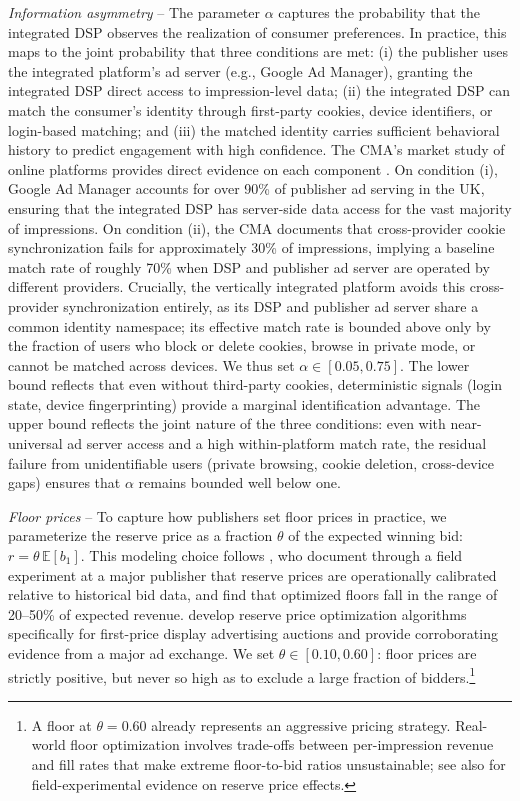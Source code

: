 \documentclass[11pt]{article}
\theoremstyle{plain}
\theoremstyle{definition}
\theoremstyle{plain}
\theoremstyle{plain}
\theoremstyle{plain}
\theoremstyle{plain}
\numberwithin{equation}{section}
\begin{document}
\noindent \textit{Information asymmetry} -- The parameter $\alpha$ captures the probability that the integrated DSP observes the realization of consumer preferences. In practice, this maps to the joint probability that three conditions are met: (i) the publisher uses the integrated platform's ad server (e.g., Google Ad Manager), granting the integrated DSP direct access to impression-level data; (ii) the integrated DSP can match the consumer's identity through first-party cookies, device identifiers, or login-based matching; and (iii) the matched identity carries sufficient behavioral history to predict engagement with high confidence. The CMA's market study of online platforms provides direct evidence on each component \parencite{competitionandmarketsauthorityOnlinePlatformsDigital2020}. On condition (i), Google Ad Manager accounts for over 90\% of publisher ad serving in the UK, ensuring that the integrated DSP has server-side data access for the vast majority of impressions. On condition (ii), the CMA documents that cross-provider cookie synchronization fails for approximately 30\% of impressions, implying a baseline match rate of roughly 70\% when DSP and publisher ad server are operated by different providers. Crucially, the vertically integrated platform avoids this cross-provider synchronization entirely, as its DSP and publisher ad server share a common identity namespace; its effective match rate is bounded above only by the fraction of users who block or delete cookies, browse in private mode, or cannot be matched across devices. We thus set $\alpha \in [0.05, 0.75]$. The lower bound reflects that even without third-party cookies, deterministic signals (login state, device fingerprinting) provide a marginal identification advantage. The upper bound reflects the joint nature of the three conditions: even with near-universal ad server access and a high within-platform match rate, the residual failure from unidentifiable users (private browsing, cookie deletion, cross-device gaps) ensures that $\alpha$ remains bounded well below one.\par
\vspace{1mm}
\noindent \textit{Floor prices} -- To capture how publishers set floor prices in practice, we parameterize the reserve price as a fraction $\theta$ of the expected winning bid: $r = \theta \, \mathbb{E}[b_1]$. This modeling choice follows \textcite{choiOptimizingReservePrices2023}, who document through a field experiment at a major publisher that reserve prices are operationally calibrated relative to historical bid data, and find that optimized floors fall in the range of 20--50\% of expected revenue. \textcite{fengReservePriceOptimization2021} develop reserve price optimization algorithms specifically for first-price display advertising auctions and provide corroborating evidence from a major ad exchange. We set $\theta \in [0.10, 0.60]$: floor prices are strictly positive, but never so high as to exclude a large fraction of bidders.\footnote{A floor at $\theta = 0.60$ already represents an aggressive pricing strategy. Real-world floor optimization involves trade-offs between per-impression revenue and fill rates that make extreme floor-to-bid ratios unsustainable; see also \textcite{ostrovskyReservePricesInternet2023} for field-experimental evidence on reserve price effects.}
\end{document}

